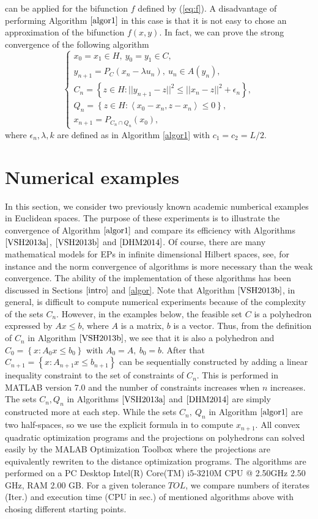 \documentclass{aims}
\theoremstyle{definition}
\begin{document}
can be applied for the bifunction $f$ defined by (\ref{eq:f}). A disadvantage of performing Algorithm $\ref{algor1}$ in this case is that it is not 
easy to chose an approximation of the bifunction $f(x,y)$. In fact, we can prove the strong convergence of the following algorithm
\begin{equation}\label{H2015a}
\left \{
\begin{array}{ll}
x_0=x_1 \in H, ~y_0=y_1\in C,\\
y_{n+1}=  P_C\left(x_n-\lambda u_n\right),~u_n\in A(y_n),\\
C_n=\left\{z\in H:||y_{n+1}-z||^2\leq ||x_n-z||^2+\epsilon_n \right\},\\
Q_n=\left\{z\in H: \left\langle x_0-x_n,z-x_n\right\rangle\le 0\right\},\\
x_{n+1}=P_{C_n\cap Q_n}(x_0),
\end{array}
\right.
\end{equation}
where $\epsilon_n, \lambda, k$ are defined as in Algorithm \ref{algor1} with $c_1=c_2=L/2$.  
\section{Numerical examples}\label{Numer}
In this section, we consider two previously known academic numberical examples in Euclidean spaces. The purpose of these experiments is to 
illustrate the convergence of Algorithm $\ref{algor1}$ and compare its efficiency with Algorithms $\ref{VSH2013a}$, $\ref{VSH2013b}$ 
and $\ref{DHM2014}$. Of course, there are many mathematical models for EPs in infinite dimensional Hilbert spaces, see, for instance 
\cite{BO1994} and the norm convergence of algorithms is more necessary than the weak convergence. The ability of the implementation of these 
algorithms has been discussed in Sections $\ref{intro}$ and \ref{algor}. Note that Algorithm $\ref{VSH2013b}$, in general, is difficult to compute numerical 
experiments because of the complexity of the sets $C_n$. However, in the examples below, the feasible set $C$ is a polyhedron expressed by 
$Ax\le b$, where $A$ is a matrix, $b$ is a vector. Thus, from the definition of $C_n$ in Algorithm $\ref{VSH2013b}$, we see that it
is also a polyhedron and $C_0=\left\{x:A_0x\le b_0\right\}$ with $A_0=A,~b_0=b$. After that $C_{n+1}=\left\{x:A_{n+1}x\le b_{n+1}\right\}$ 
can be sequentially constructed by adding a linear inequality constraint to the set of constraints of $C_n$. This is performed in MATLAB version 
7.0 and the number of constraints increases when $n$ increases. The sets $C_n, Q_n$ in Algorithms $\ref{VSH2013a}$ and $\ref{DHM2014}$ 
are simply constructed more at each step. While the sets $C_n,~Q_n$ in Algorithm $\ref{algor1}$ are two half-spaces, so we use the explicit formula 
in \cite{CH2005,SS2000} to compute $x_{n+1}$. All convex quadratic optimization programs and the projections on polyhedrons can solved easily 
by the MALAB Optimization Toolbox where the projections are equivalently rewriten to the distance optimization programs. The algorithms are performed on a 
PC Desktop Intel(R) Core(TM) i5-3210M CPU @ 2.50GHz 2.50 GHz, RAM 2.00 GB. For a given tolerance $TOL$, we compare numbers of iterates (Iter.) 
and execution time (CPU in sec.) of mentioned algorithms above with chosing different starting points.
\end{document}
